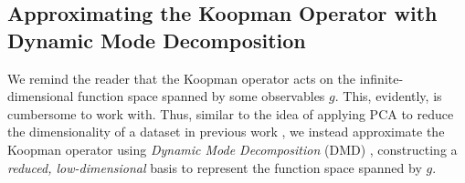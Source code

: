 

\subsection{Approximating the Koopman Operator with Dynamic Mode Decomposition}

We remind the reader that the Koopman operator acts on the infinite-dimensional function space spanned by some observables $g$. This, evidently, is cumbersome to work with. Thus, similar to the idea of applying PCA to reduce the dimensionality of a dataset in previous work \cite{kim2013subspace,treuille2006model}, we instead approximate the Koopman operator using \textit{Dynamic Mode Decomposition} (DMD) \cite{schmid2010dynamic}, constructing a \textit{reduced, low-dimensional} basis to represent the function space spanned by $g$.

